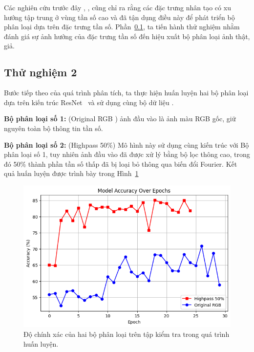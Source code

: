 Các nghiên cứu trước đây \cite{Jeong2021BiHPFBH}, \cite{Frank2020LeveragingFA}, \cite{Jeong2022FrePGANRD} cũng chỉ ra rằng các đặc trưng nhân tạo có xu hướng tập trung ở vùng tần số cao và đã tận dụng điều này để phát triển bộ phân loại dựa trên đặc trưng tần số. Phần~\ref{ssec:thu_nghiem_2}, ta tiến hành thử nghiệm nhằm đánh giá sự ảnh hưởng của đặc trưng tần số đến hiệu xuất bộ phân loại ảnh thật, giả.

\subsection{Thử nghiệm 2}
\label{ssec:thu_nghiem_2}
Bước tiếp theo của quá trình phân tích, ta thực hiện huấn luyện hai bộ phân loại dựa trên kiến trúc ResNet~\cite{He2015DeepRL} và sử dụng cùng bộ dữ liệu \cite{Krizhevsky2012ImageNetCW}.

\textbf{Bộ phân loại số 1:} (Original RGB ) ảnh đầu vào là ảnh màu RGB gốc, giữ nguyên toàn bộ thông tin tần số.  

\textbf{Bộ phân loại số 2:} (Highpass 50\%) Mô hình này sử dụng cùng kiến trúc với Bộ phân loại số 1, tuy nhiên ảnh đầu vào đã được xử lý bằng bộ lọc thông cao, trong đó 50\% thành phần tần số thấp đã bị loại bỏ thông qua biến đổi Fourier. Kết quả huấn luyện được trình bày trong Hình~\ref{fig:Experiment_Highpass50_percent}

%
\begin{figure}[h!]
	\centering
	\includegraphics[width=1.0\linewidth]{Images/Experiment_Highpass50_percent.png}
	\begin{minipage}{1.0\linewidth}
		\caption{Độ chính xác của hai bộ phân loại trên tập kiểm tra trong quá trình huấn luyện.}
		\label{fig:Experiment_Highpass50_percent}
	\end{minipage}
\end{figure}

